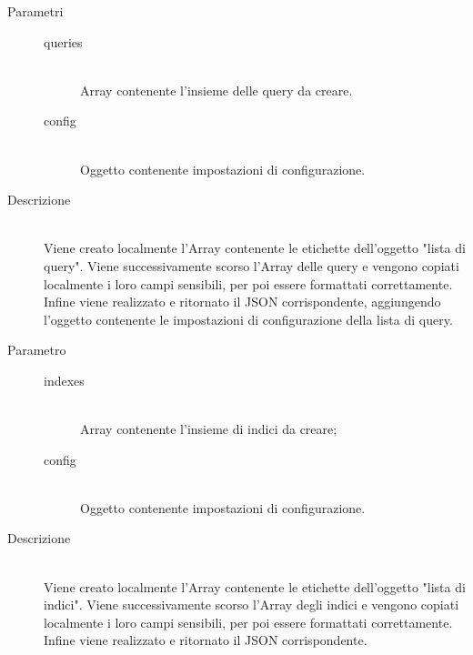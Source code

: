 \begin{description}
\begin{mldescription}
    \hfill
   \begin{description}
    \item[Parametri] \hfill
     \begin{description}
      \item[queries] \hfill \\
      Array contenente l'insieme delle query da creare.
      \item[config] \hfill \\
      Oggetto contenente impostazioni di configurazione.
     \end{description}
    \item[Descrizione] \hfill \\
    Viene creato localmente l'Array contenente le etichette dell'oggetto "lista di query". Viene successivamente scorso l'Array delle query e vengono copiati localmente i loro campi sensibili, per poi essere formattati correttamente. Infine viene realizzato e ritornato il JSON corrispondente, aggiungendo l'oggetto contenente le impostazioni di configurazione della lista di query.
   \end{description}
   
    \hfill
      \begin{description}
       \item[Parametro] \hfill
        \begin{description}
         \item[indexes] \hfill \\
         Array contenente l'insieme di indici da creare;
         \item[config] \hfill \\
         Oggetto contenente impostazioni di configurazione.
        \end{description}
       \item[Descrizione] \hfill \\
       Viene creato localmente l'Array contenente le etichette dell'oggetto "lista di indici". Viene successivamente scorso l'Array degli indici e vengono copiati localmente i loro campi sensibili, per poi essere formattati correttamente. Infine viene realizzato e ritornato il JSON corrispondente.
      \end{description}
   

\end{mldescription}
\end{description}

